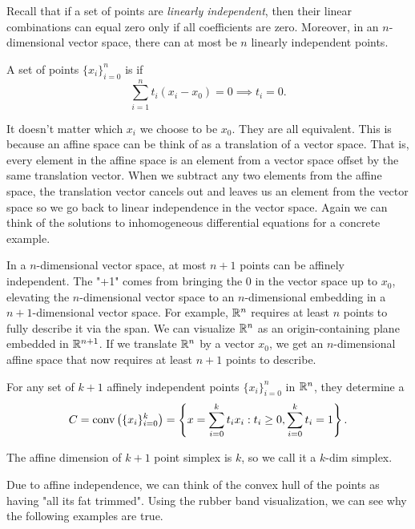 \documentclass[class=article,crop=false]{standalone}
\begin{document}
Recall that if a set of points are \emph{linearly independent}, then their linear combinations can equal zero only if all coefficients are zero. Moreover, in an $ n$-dimensional vector space, there can at most be $ n$ linearly independent points.

\begin{defn}
A set of points $ \{x_i\}_{i=0}^n $ is  if
\[
	\sum_{ i= 1}^{ n} t_i (x_i -x_0) =0 \implies t_i =0
.\] 
\end{defn}
\begin{remark}
It doesn't matter which $ x_i$ we choose to be $ x_0$. They are all equivalent. This is because an affine space can be think of as a translation of a vector space. That is, every element in the affine space is an element from a vector space offset by the same translation vector. When we subtract any two elements from the affine space, the translation vector cancels out and leaves us an element from the vector space so we go back to linear independence in the vector space. Again we can think of the solutions to inhomogeneous differential equations for a concrete example.
\end{remark}

\begin{remark}
	In a $ n$-dimensional vector space, at most $ n+1$ points can be affinely independent. The "+1" comes from bringing the 0 in the vector space up to $ x_0$, elevating the $ n$-dimensional vector space to an $ n$-dimensional embedding in a $ n+1$-dimensional vector space. For example, $ \mathbb{R}^{n}$ requires at least $ n$ points to fully describe it via the span. We can visualize $ \mathbb{R}^{n}$ as an origin-containing plane embedded in $ \mathbb{R}^{n+1}$. If we translate $ \mathbb{R}^{n}$ by a vector $ x_0$, we get an $ n$-dimensional affine space that now requires at least $ n+1$ points to describe.
\end{remark}

\begin{defn}[simplex]
For any set of $ k+1$ affinely independent points $ \{x_i\}_{i=0}^n $ in $ \mathbb{R}^{n}$, they determine a 
\[
	C = \operatorname{conv} \left( \{x_i\}_{i=0}^k \right) = \left\{ x= \sum_{ i= 0}^{ k} t_i x_i: t_i \geq 0, \sum_{ i= 0}^{ k} t_i = 1 \right\}  
.\] 
\end{defn}
\begin{note}
The affine dimension of $ k+1$ point simplex is  $ k$, so we call it a  $ k$-dim simplex.
\end{note}
\begin{intuition}
	Due to affine independence, we can think of the convex hull of the points as having "all its fat trimmed". Using the rubber band visualization, we can see why the following examples are true.
\end{intuition}
\end{document}
